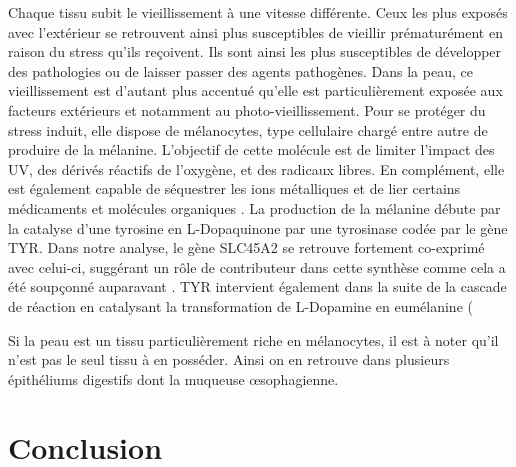 Chaque tissu subit le vieillissement à une vitesse différente. Ceux les plus exposés avec l'extérieur se retrouvent ainsi plus susceptibles de vieillir prématurément en raison du stress qu'ils reçoivent. Ils sont ainsi les plus susceptibles de développer des pathologies ou de laisser passer des agents pathogènes.
Dans la peau, ce vieillissement est d'autant plus accentué qu'elle est particulièrement exposée aux facteurs extérieurs et notamment au photo-vieillissement. 
Pour se protéger du stress induit, elle dispose de mélanocytes, type cellulaire chargé entre autre de produire de la mélanine. L'objectif de cette molécule est de limiter l'impact des UV, des dérivés réactifs de l'oxygène, et des radicaux libres. En complément, elle est également capable de séquestrer les ions métalliques et de lier certains médicaments et molécules organiques \cite{Tolleson2005}. 
La production de la mélanine débute par la catalyse d'une tyrosine en L-Dopaquinone par une tyrosinase codée par le gène TYR. Dans notre analyse, le gène SLC45A2 se retrouve fortement co-exprimé avec celui-ci, suggérant un rôle de contributeur dans cette synthèse comme cela a été soupçonné auparavant \cite{Cullinane2011Oct, Ginger2008}. 
TYR intervient également dans la suite de la cascade de réaction en catalysant la transformation de L-Dopamine en eumélanine (



Si la peau est un tissu particulièrement riche en mélanocytes, il est à noter qu'il n'est pas le seul tissu à en posséder. Ainsi on en retrouve dans plusieurs épithéliums digestifs dont la muqueuse œsophagienne. 




\section{Conclusion}

